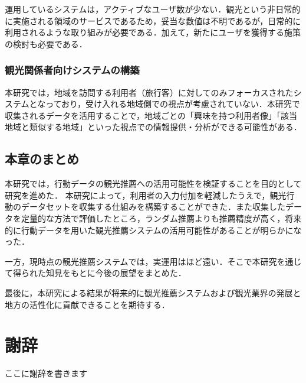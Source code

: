 \documentclass{jsarticle}
\begin{document}
運用しているシステムは，アクティブなユーザ数が少ない．観光という非日常的に実施される領域のサービスであるため，妥当な数値は不明であるが，日常的に利用されるような取り組みが必要である．加えて，新たにユーザを獲得する施策の検討も必要である．

\subsubsection{観光関係者向けシステムの構築}

本研究では，地域を訪問する利用者（旅行客）に対してのみフォーカスされたシステムとなっており，受け入れる地域側での視点が考慮されていない．本研究で収集されるデータを活用することで，地域ごとの「興味を持つ利用者像」「該当地域と類似する地域」といった視点での情報提供・分析ができる可能性がある．

\subsection{本章のまとめ}

本研究では，行動データの観光推薦への活用可能性を検証することを目的として研究を進めた．
本研究によって，利用者の入力付加を軽減したうえで，観光行動のデータセットを収集する仕組みを構築することができた．また収集したデータを定量的な方法で評価したところ，ランダム推薦よりも推薦精度が高く，将来的に行動データを用いた観光推薦システムの活用可能性があることが明らかになった．

一方，現時点の観光推薦システムでは，実運用はほど遠い．そこで本研究を通じて得られた知見をもとに今後の展望をまとめた．

最後に，本研究による結果が将来的に観光推薦システムおよび観光業界の発展と地方の活性化に貢献できることを期待する．

\newpage

\newpage
\section*{謝辞}

ここに謝辞を書きます


\newpage

\end{document}
